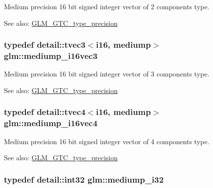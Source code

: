 Medium precision 16 bit signed integer vector of 2 components type. \begin{Desc}
\item[See also:]\hyperlink{group__gtc__type__precision}{GLM\_\-GTC\_\-type\_\-precision} \end{Desc}
\hypertarget{group__gtc__type__precision_gd9e470f707da812fe454505c99035471}{
\subsubsection[mediump\_\-i16vec3]{\setlength{\rightskip}{0pt plus 5cm}typedef detail::tvec3$<$i16, mediump$>$ {\bf glm::mediump\_\-i16vec3}}}
\label{group__gtc__type__precision_gd9e470f707da812fe454505c99035471}


Medium precision 16 bit signed integer vector of 3 components type. \begin{Desc}
\item[See also:]\hyperlink{group__gtc__type__precision}{GLM\_\-GTC\_\-type\_\-precision} \end{Desc}
\hypertarget{group__gtc__type__precision_gd9aca299fc3e96c84be6b063381c9f3e}{
\subsubsection[mediump\_\-i16vec4]{\setlength{\rightskip}{0pt plus 5cm}typedef detail::tvec4$<$i16, mediump$>$ {\bf glm::mediump\_\-i16vec4}}}
\label{group__gtc__type__precision_gd9aca299fc3e96c84be6b063381c9f3e}


Medium precision 16 bit signed integer vector of 4 components type. \begin{Desc}
\item[See also:]\hyperlink{group__gtc__type__precision}{GLM\_\-GTC\_\-type\_\-precision} \end{Desc}
\hypertarget{group__gtc__type__precision_g5e00ec824eb55968a6b6496f294d8c07}{
\subsubsection[mediump\_\-i32]{\setlength{\rightskip}{0pt plus 5cm}typedef detail::int32 {\bf glm::mediump\_\-i32}}}
\label{group__gtc__type__precision_g5e00ec824eb55968a6b6496f294d8c07}


